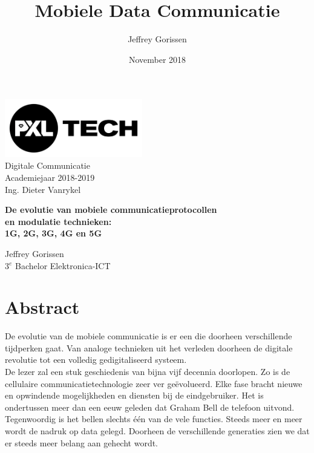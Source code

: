 \documentclass{article}
\title{Mobiele Data Communicatie}
\author{Jeffrey Gorissen}
\date{November 2018}
\begin{document}
\begin{titlepage}
  
  \begin{flushright}
	  \includegraphics[width=6cm]{img/PXL-Tech.png}\\ 
    \Large 	Digitale Communicatie \\
    				Academiejaar 2018-2019\\
    				Ing. Dieter Vanrykel
  \end{flushright}
    \vspace*{\fill}
    		\begin{center}
      		\Huge \bf De evolutie van mobiele communicatieprotocollen \\en modulatie technieken:\\ 1G, 2G, 3G, 4G en 5G\\[3cm]
    		\end{center}
    \vspace*{\fill}
  \begin{flushright}
    \Large
        Jeffrey Gorissen\\
        \vspace{5mm} 
		3$^e$ Bachelor Elektronica-ICT\\
		 
  \end{flushright}
  
\end{titlepage}

\tableofcontents

\newpage

\section{Abstract}
De evolutie van de mobiele communicatie is er een die doorheen verschillende tijdperken gaat. Van analoge technieken uit het verleden doorheen de digitale revolutie tot een volledig gedigitaliseerd systeem.\\

\noindent De lezer zal een stuk geschiedenis van bijna vijf decennia doorlopen. Zo is de cellulaire communicatietechnologie zeer ver geëvolueerd. Elke fase bracht nieuwe en opwindende mogelijkheden en diensten bij de eindgebruiker. Het is ondertussen meer dan een eeuw geleden dat Graham Bell de telefoon uitvond. Tegenwoordig is het bellen slechts één van de vele functies. Steeds meer en meer wordt de nadruk op data gelegd. Doorheen de verschillende generaties zien we dat er steeds meer belang aan gehecht wordt.\\
\end{document}
